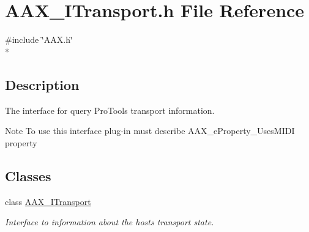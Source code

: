 \hypertarget{a00263}{}\section{A\+A\+X\+\_\+\+I\+Transport.\+h File Reference}
\label{a00263}
{\ttfamily \#include \char`\"{}A\+A\+X.\+h\char`\"{}}\\*


\subsection{Description}
The interface for query Pro\+Tools transport information. 

\begin{DoxyNote}{Note}
To use this interface plug-\/in must describe A\+A\+X\+\_\+e\+Property\+\_\+\+Uses\+M\+I\+D\+I property 
\end{DoxyNote}
\subsection*{Classes}
\begin{DoxyCompactItemize}
\item 
class \hyperlink{a00116}{A\+A\+X\+\_\+\+I\+Transport}
\begin{DoxyCompactList}\small\item\em Interface to information about the host\textquotesingle{}s transport state. \end{DoxyCompactList}\end{DoxyCompactItemize}

